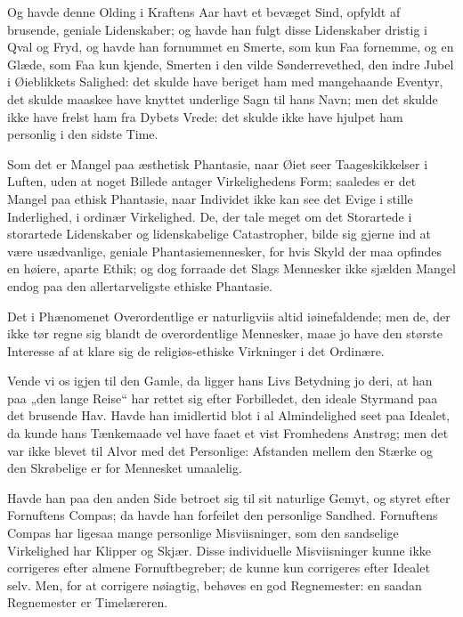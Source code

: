 \documentclass[12pt,a4paper]{book}
\newcommand{\apage}[1]{\marginnote{\footnotesize\textit{[#1]}}}
\begin{document}
Og havde denne Olding i Kraftens Aar havt et bevæget Sind, opfyldt af
brusende, geniale Lidenskaber; og havde han fulgt disse Lidenskaber dristig
i Qval og Fryd, og havde han fornummet en Smerte, som kun Faa fornemme, og
en Glæde, som Faa kun kjende, Smerten i den vilde Sønderrevethed, den indre
Jubel i Øieblikkets Salighed: det skulde have beriget ham med mangehaande
Eventyr, det skulde maaskee have knyttet underlige Sagn til hans Navn; men
det skulde ikke have frelst ham fra Dybets Vrede: det skulde ikke have
hjulpet ham personlig i den sidste Time.

Som det er Mangel paa æsthetisk Phantasie, naar Øiet seer Taageskikkelser i
Luften, uden at noget Billede antager Virkelighedens Form; saaledes er det
Mangel paa ethisk Phantasie, naar Individet ikke kan see det Evige i stille
Inderlighed, i ordinær Virkelighed. De, der tale meget om det Storartede i
storartede Lidenskaber og lidenskabelige Catastropher, bilde sig gjerne ind
at være usædvanlige, geniale Phantasiemennesker, for hvis Skyld der maa
opfindes en høiere, aparte Ethik; og dog forraade det Slags Mennesker ikke
sjælden Mangel endog paa den allertarveligste ethiske Phantasie.

Det i Phænomenet Overordentlige er naturligviis altid iøinefaldende; men
de, der ikke tør regne sig blandt de overordentlige Mennesker, maae jo have
den største Interesse af at klare sig de religiøs-ethiske Virkninger i det
Ordinære.
 \apage{115}

Vende vi os igjen til den Gamle, da ligger hans Livs Betydning jo deri, at
han paa „den lange Reise“ har rettet sig efter Forbilledet, den ideale
Styrmand paa det brusende Hav. Havde han imidlertid blot i al Almindelighed
seet paa Idealet, da kunde hans Tænkemaade vel have faaet et vist
Fromhedens Anstrøg; men det var ikke blevet til Alvor med det Personlige:
Afstanden mellem den Stærke og den Skrøbelige er for Mennesket umaalelig.

Havde han paa den anden Side betroet sig til sit naturlige Gemyt, og styret
efter Fornuftens Compas; da havde han forfeilet den personlige Sandhed.
Fornuftens Compas har ligesaa mange personlige Misviisninger, som den
sandselige Virkelighed har Klipper og Skjær. Disse individuelle
Misviisninger kunne ikke corrigeres efter almene Fornuftbegreber; de kunne
kun corrigeres efter Idealet selv. Men, for at corrigere nøiagtig, behøves
en god Regnemester: en saadan Regnemester er Timelæreren.
\end{document}
